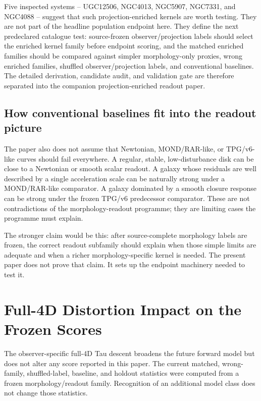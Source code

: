 \documentclass[11pt]{article}
\begin{document}
Five inspected systems -- UGC12506, NGC4013, NGC5907, NGC7331, and NGC4088 -- suggest
that such projection-enriched kernels are worth testing.  They are not part of
the headline population endpoint here.  They define the next predeclared
catalogue test: source-frozen observer/projection labels should select the
enriched kernel family before endpoint scoring, and the matched enriched
families should be compared against simpler morphology-only proxies, wrong
enriched families, shuffled observer/projection labels, and conventional
baselines.  The detailed derivation, candidate audit, and validation gate are
therefore separated into the companion projection-enriched readout paper.

\subsection{How conventional baselines fit into the readout picture}

The paper also does not assume that Newtonian, MOND/RAR-like, or TPG/v6-like
curves should fail everywhere.  A regular, stable, low-disturbance disk can be
close to a Newtonian or smooth scalar readout.  A galaxy whose residuals are
well described by a single acceleration scale can be naturally strong under a
MOND/RAR-like comparator.  A galaxy dominated by a smooth closure response can
be strong under the frozen TPG/v6 predecessor comparator.  These are not
contradictions of the morphology-readout programme; they are limiting cases the
programme must explain.

The stronger claim would be this: after source-complete morphology labels are
frozen, the correct readout subfamily should explain when those simple limits
are adequate and when a richer morphology-specific kernel is needed.  The
present paper does not prove that claim.  It sets up the endpoint machinery
needed to test it.

\section{Full-4D Distortion Impact on the Frozen Scores}

The observer-specific full-4D Tau descent broadens the future forward model
but does not alter any score reported in this paper.  The current matched,
wrong-family, shuffled-label, baseline, and holdout statistics were computed
from a frozen morphology/readout family.  Recognition of an additional model
class does not change those statistics.
\end{document}
